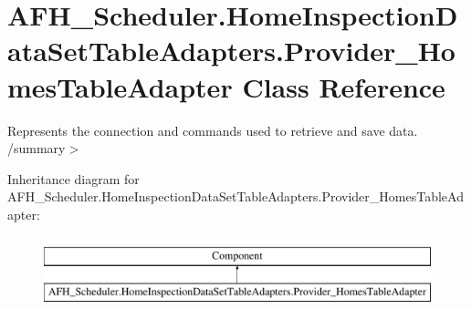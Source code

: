 \section{A\+F\+H\+\_\+\+Scheduler.\+Home\+Inspection\+Data\+Set\+Table\+Adapters.\+Provider\+\_\+\+Homes\+Table\+Adapter Class Reference}
\label{class_a_f_h___scheduler_1_1_home_inspection_data_set_table_adapters_1_1_provider___homes_table_adapter}


Represents the connection and commands used to retrieve and save data. /summary$>$  


Inheritance diagram for A\+F\+H\+\_\+\+Scheduler.\+Home\+Inspection\+Data\+Set\+Table\+Adapters.\+Provider\+\_\+\+Homes\+Table\+Adapter\+:\begin{figure}[H]
\begin{center}
\leavevmode
\includegraphics[height=2.000000cm]{class_a_f_h___scheduler_1_1_home_inspection_data_set_table_adapters_1_1_provider___homes_table_adapter}
\end{center}
\end{figure}
